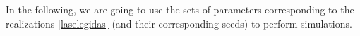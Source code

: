 
In the following, we are going to use the sets of parameters corresponding to the realizations \eqref{laselegidas} (and their corresponding seeds) to perform simulations. 
